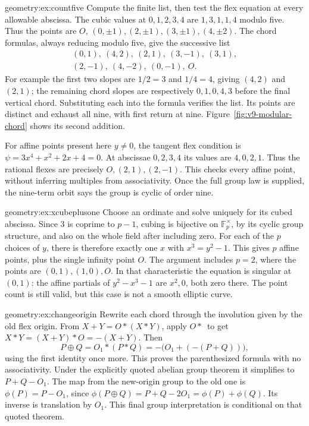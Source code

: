 \begin{solution}{geometry:ex:countfive}
\idea Compute the finite list, then test the flex equation at every allowable abscissa.
\writeup The cubic values at $0,1,2,3,4$ are $1,3,1,1,4$ modulo five. Thus the points are $O$, $(0,\pm1),(2,\pm1),(3,\pm1),(4,\pm2)$. The chord formulas, always reducing modulo five, give the successive list
\[
\begin{gathered}
(0,1),\ (4,2),\ (2,1),\ (3,-1),\ (3,1),\\
(2,-1),\ (4,-2),\ (0,-1),\ O.
\end{gathered}
\]
For example the first two slopes are $1/2=3$ and $1/4=4$, giving $(4,2)$ and $(2,1)$; the remaining chord slopes are respectively $0,1,0,4,3$ before the final vertical chord. Substituting each into the formula verifies the list. Its points are distinct and exhaust all nine, with first return at nine. Figure~\ref{fig:v9-modular-chord} shows its second addition.

For affine points present here $y\ne0$, the tangent flex condition is $\psi=3x^4+x^2+2x+4=0$. At abscissae $0,2,3,4$ its values are $4,0,2,1$. Thus the rational flexes are precisely $O,(2,1),(2,-1)$. This checks every affine point, without inferring multiples from associativity. Once the full group law is supplied, the nine-term orbit says the group is cyclic of order nine.
\end{solution}
\begin{solution}{geometry:ex:xcubeplusone}
\idea Choose an ordinate and solve uniquely for its cubed abscissa.
\writeup Since $3$ is coprime to $p-1$, cubing is bijective on $\mathbb F_p^\times$, by its cyclic group structure, and also on the whole field after including zero. For each of the $p$ choices of $y$, there is therefore exactly one $x$ with $x^3=y^2-1$. This gives $p$ affine points, plus the single infinity point $O$. The argument includes $p=2$, where the points are $(0,1),(1,0),O$. In that characteristic the equation is singular at $(0,1)$: the affine partials of $y^2-x^3-1$ are $x^2,0$, both zero there. The point count is still valid, but this case is not a smooth elliptic curve.
\end{solution}
\begin{solution}{geometry:ex:changeorigin}
\idea Rewrite each chord through the involution given by the old flex origin.
\writeup From $X+Y=O*(X*Y)$, apply $O*\,$ to get $X*Y=(X+Y)*O=-(X+Y)$. Then
\[
P\oplus Q=O_1*(P*Q)=-\bigl(O_1+(-(P+Q))\bigr),
\]
using the first identity once more. This proves the parenthesized formula with no associativity. Under the explicitly quoted abelian group theorem it simplifies to $P+Q-O_1$. The map from the new-origin group to the old one is $\phi(P)=P-O_1$, since
$\phi(P\oplus Q)=P+Q-2O_1=\phi(P)+\phi(Q)$. Its inverse is translation by $O_1$. This final group interpretation is conditional on that quoted theorem.
\end{solution}
